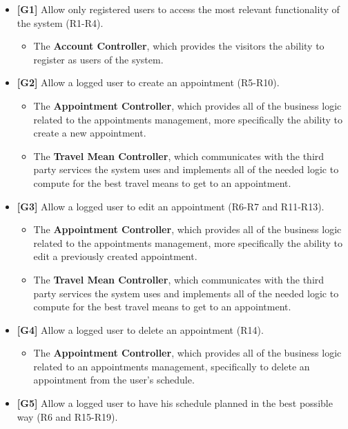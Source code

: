 \documentclass[12pt]{article}
\begin{document}
\begin{itemize}
    \item \textbf{{[G1]}} Allow only registered users to access the most relevant functionality of the system (R1-R4).
    \begin{itemize}
        \item The \textbf{Account Controller}, which provides the visitors the ability to register as users of the system.
    \end{itemize}
    \item \textbf{{[G2]}} Allow a logged user to create an appointment (R5-R10).
    \begin{itemize}
        \item The \textbf{Appointment Controller}, which provides all of the business logic related to the appointments management, more specifically the ability to create a new appointment.
        \item The \textbf{Travel Mean Controller}, which communicates with the third party services the system uses and implements all of the needed logic to compute for the best travel means to get to an appointment.
    \end{itemize}
    \item \textbf{{[G3]}} Allow a logged user to edit an appointment (R6-R7 and R11-R13).
    \begin{itemize}
        \item The \textbf{Appointment Controller}, which provides all of the business logic related to the appointments management, more specifically the ability to edit a previously created appointment.
        \item The \textbf{Travel Mean Controller}, which communicates with the third party services the system uses and implements all of the needed logic to compute for the best travel means to get to an appointment.
    \end{itemize}
    \item \textbf{{[G4]}} Allow a logged user to delete an appointment (R14).
    \begin{itemize}
        \item The \textbf{Appointment Controller}, which provides all of the business logic related to an appointments management, specifically to delete an appointment from the user's schedule.
    \end{itemize}
    \item \textbf{{[G5]}} Allow a logged user to have his schedule planned in the best possible way (R6 and R15-R19).

\end{itemize}
\end{document}
